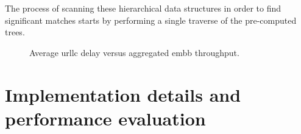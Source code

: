 \documentclass[a4paper, 11pt, oneside]{article}
\newlength\fheight
\newlength\fwidth
\begin{document}
The process of scanning these hierarchical data structures in order to find significant matches starts by performing a single traverse of  the pre-computed trees.



    
\begin{figure}[h!]
  \centering
    \setlength{}
    \setlength{}
    
    \setlength\belowcaptionskip{-.3cm}
    \caption{Average \gls{urllc} delay versus aggregated \gls{embb} throughput.}
    \label{Fig:t_d_versus_numEmbbUes}
\end{figure}    

	\section*{Implementation details and performance evaluation}    



\end{document}
